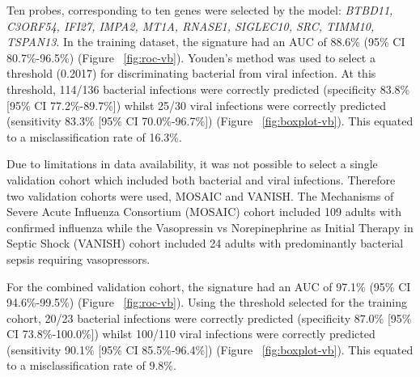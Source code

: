 Ten probes, corresponding to ten genes were selected by the model: \textit{BTBD11, C3ORF54, IFI27, IMPA2, MT1A, RNASE1, SIGLEC10, SRC, TIMM10, TSPAN13}. In the training dataset, the signature had an AUC of 88.6\% (95\% CI 80.7\%-96.5\%) (Figure ~\ref{fig:roc-vb}). Youden's method was used to select a threshold (0.2017) for discriminating bacterial from viral infection. At this threshold, 114/136 bacterial infections were correctly predicted (specificity 83.8\% [95\% CI 77.2\%-89.7\%]) whilst 25/30 viral infections were correctly predicted (sensitivity 83.3\% [95\% CI 70.0\%-96.7\%]) (Figure ~\ref{fig:boxplot-vb}). This equated to a misclassification rate of 16.3\%.
 
Due to limitations in data availability, it was not possible to select a single validation cohort which included both bacterial and viral infections. Therefore two validation cohorts were used, MOSAIC and VANISH. The Mechanisms of Severe Acute Influenza Consortium (MOSAIC) cohort included 109 adults with confirmed influenza while the Vasopressin vs Norepinephrine as Initial Therapy in Septic Shock (VANISH) cohort included 24 adults with predominantly bacterial sepsis requiring vasopressors. 

For the combined validation cohort, the signature had an AUC of 97.1\% (95\% CI 94.6\%-99.5\%) (Figure ~\ref{fig:roc-vb}). Using the threshold selected for the training cohort, 20/23 bacterial infections were correctly predicted (specificity 87.0\% [95\% CI 73.8\%-100.0\%]) whilst 100/110 viral infections were correctly predicted (sensitivity 90.1\% [95\% CI 85.5\%-96.4\%]) (Figure ~\ref{fig:boxplot-vb}). This equated to a misclassification rate of 9.8\%. 

